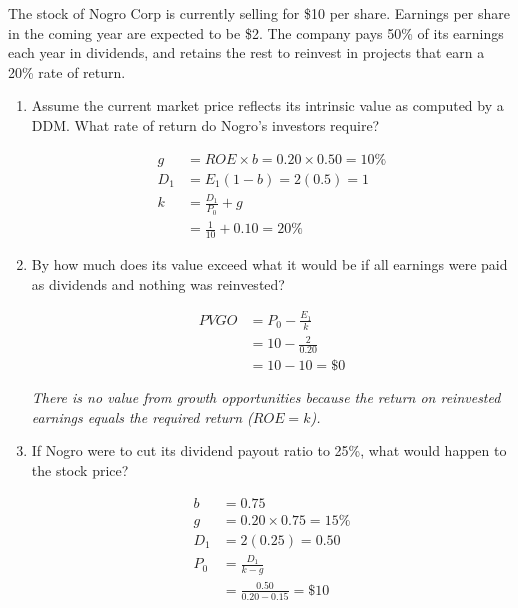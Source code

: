 \documentclass[11pt]{article}
\theoremstyle{definition}
\begin{document}
\begin{shaded}
    The stock of Nogro Corp is currently selling for \$10 per share.
    Earnings per share in the coming year are expected to be \$2.
    The company pays 50\% of its earnings each year in dividends,
    and retains the rest to reinvest in projects that earn a 20\%
    rate of return.

    \begin{enumerate}
        \item[a.] Assume the current market price reflects its intrinsic
        value as computed by a DDM. What rate of return do Nogro's
        investors require?

        \begin{align*}
            g &= ROE \times b = 0.20 \times 0.50 = 10\%\\
            D_1 &= E_1(1-b) = 2(0.5) = 1\\
            k &= \frac{D_1}{P_0} + g\\
              &= \frac{1}{10} + 0.10 = 20\%
        \end{align*}

        \item[b.] By how much does its value exceed what it would be
        if all earnings were paid as dividends and nothing was reinvested?

        \begin{align*}
            PVGO &= P_0 - \frac{E_1}{k}\\
                 &= 10 - \frac{2}{0.20}\\
                 &= 10 - 10 = \$0
        \end{align*}

        \textit{There is no value from growth opportunities because
        the return on reinvested earnings equals the required
        return ($ROE=k$).}

        \item[c.] If Nogro were to cut its dividend payout ratio
        to 25\%, what would happen to the stock price?

        \begin{align*}
            b &= 0.75\\
            g &= 0.20 \times 0.75 = 15\%\\
            D_1 &= 2(0.25) = 0.50\\
            P_0 &= \frac{D_1}{k-g}\\
                &= \frac{0.50}{0.20-0.15} = \$10
        \end{align*}


\end{enumerate}
\end{shaded}
\end{document}
